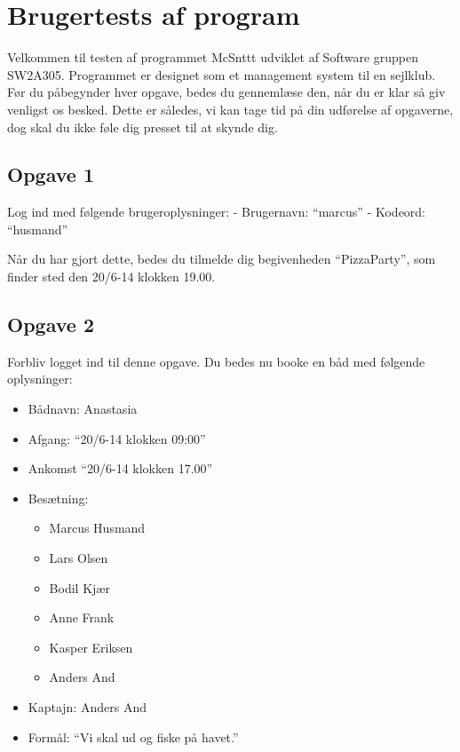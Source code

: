 \chapter{Brugertests af program}\label{BrugerTestCases}


Velkommen til testen af programmet McSnttt udviklet af Software gruppen SW2A305.
Programmet er designet som et management system til en sejlklub.
Før du påbegynder hver opgave, bedes du gennemlæse den, når du er klar så giv venligst os besked.
Dette er således, vi kan tage tid på din udførelse af opgaverne, dog skal du ikke føle dig presset til at skynde dig.

\section{Opgave 1}

Log ind med følgende brugeroplysninger: 
\newline - Brugernavn: ``marcus''
\newline - Kodeord: ``husmand''

Når du har gjort dette, bedes du tilmelde dig begivenheden ``PizzaParty'', som finder sted den 20/6-14 klokken 19.00.

\section{Opgave 2}

Forbliv logget ind til denne opgave. Du bedes nu booke en båd med følgende oplysninger:

\begin{itemize}
	\item Bådnavn: Anastasia
	\item Afgang: ``20/6-14 klokken 09:00''
	\item Ankomst ``20/6-14 klokken 17.00''
	\item Besætning: 
	\begin{itemize}
		\item Marcus Husmand
		\item Lars Olsen
		\item Bodil Kjær
		\item Anne Frank
		\item Kasper Eriksen
		\item Anders And
	\end{itemize}
	\item Kaptajn: Anders And
	\item Formål: ``Vi skal ud og fiske på havet.''

\end{itemize}

